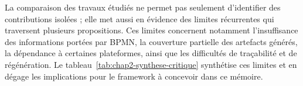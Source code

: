 \begin{table}[H]
\begin{tabularx}{\textwidth}{p{2.4cm}p{3.8cm}p{3.2cm}X}
\bottomrule
\end{tabularx}
\end{table}

La comparaison des travaux étudiés ne permet pas seulement d'identifier des contributions isolées ; elle met aussi en évidence des limites récurrentes qui traversent plusieurs propositions. Ces limites concernent notamment l'insuffisance des informations portées par BPMN, la couverture partielle des artefacts générés, la dépendance à certaines plateformes, ainsi que les difficultés de traçabilité et de régénération. Le tableau~\ref{tab:chap2-synthese-critique} synthétise ces limites et en dégage les implications pour le framework à concevoir dans ce mémoire.

